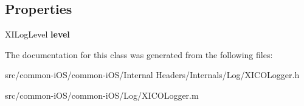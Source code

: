 \subsection*{Properties}
\begin{DoxyCompactItemize}
\item 
\hypertarget{interface_x_i_c_o_logger_a231a948bbbcb684bc2ded6303cb7b1f8}{}\label{interface_x_i_c_o_logger_a231a948bbbcb684bc2ded6303cb7b1f8} 
X\+I\+Log\+Level {\bfseries level}
\end{DoxyCompactItemize}


The documentation for this class was generated from the following files\+:\begin{DoxyCompactItemize}
\item 
src/common-\/i\+O\+S/common-\/i\+O\+S/\+Internal Headers/\+Internals/\+Log/X\+I\+C\+O\+Logger.\+h\item 
src/common-\/i\+O\+S/common-\/i\+O\+S/\+Log/X\+I\+C\+O\+Logger.\+m\end{DoxyCompactItemize}
